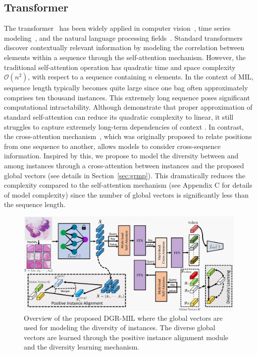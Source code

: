 \documentclass[runningheads]{llncs}
\begin{document}
\subsection{Transformer}
 The transformer~\cite{attentionisallyouneed} has been widely applied in computer vision~\cite{vit,swimtransformer,crossattention2,carion2020end}, time series modeling~\cite{timeserise1,timeserise2}, and the natural language processing fields~\cite{nlp1,nlp2,nlp3}. Standard transformers discover contextually relevant information by modeling the correlation between elements within a sequence through the self-attention mechanism. However, the traditional self-attention operation has quadratic time and space complexity $\mathcal{O}(n^2)$, with respect to a sequence containing $n$ elements. In the context of MIL, sequence length typically becomes quite large since one bag often approximately comprises ten thousand instances. This extremely long sequence poses significant computational intractability. Although \cite{wang2020linformer,shen2021efficient,guo2022beyond} demonstrate that proper approximation of standard self-attention can reduce its quadratic complexity to linear, it still struggles to capture extremely long-term dependencies of context \cite{bhattamishra2020computational,ruoss2023randomized,lowrankmil}.
In contrast, the cross-attention mechanism~\cite{crossattention2,crossattention3}, which was originally proposed to relate positions from one sequence to another, allows models to consider cross-sequence information. Inspired by this, we 
propose to model the diversity between and among instances through a cross-attention between instances and the proposed global vectors (see details in Section~\ref{sec:grmp}). This dramatically reduces the complexity compared to the self-attention mechanism (see Appendix C for details of model complexity) since the number of global vectors is significantly less than the sequence length.

\begin{figure}[t]
\centering
\includegraphics[width=1.0\textwidth]{Figure/network.jpg} %
\caption{Overview of the proposed DGR-MIL where the global vectors are used for modeling the diversity of instances. The diverse global vectors are learned through the positive instance alignment module and the diversity learning mechanism.}
\label{fig:workflow}
\end{figure}
\end{document}
